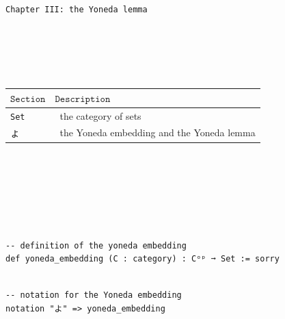 \documentclass{book}
\newcounter{lcounter}
\newcounter{sectioncount}
\newcounter{subsectioncount}
\renewcommand{\section}[1]{\newpage
\ \\
\ \\
 \begin{center} \scalebox{1.5}{\texttt{\thesectioncount . #1}} \setcounter{sectioncount}{\thesectioncount+1} \setcounter{subsectioncount}{1} \end{center}
 \begin{center}

\ \\
\ \\

\thispagestyle{empty}
\end{center}
}
\begin{document}
\newpage
{
\Huge 
\begin{center}
\ \\
\ \\
\thispagestyle{empty}
\texttt{Chapter III: the Yoneda lemma}
\end{center}
}

\ \\
\ \\
\ \\
\ \\

{
\small
\begin{center}
\begin{tabular}{|l | l |} 
 \hline
 $\texttt{Section}$ & $\texttt{Description}$ \\
 \hline
 \hline
 \texttt{Set} &\ the category of sets \\
 \hline
 ょ &\ the Yoneda embedding and the Yoneda lemma \\
 \hline 
\end{tabular}
\end{center}
}


\section{よ}

\begin{center}
\begin{tcolorbox}[width=5in,colback={white},title={\begin{center}\texttt{Lean \thelcounter} \addtocounter{lcounter}{1}  \end{center}},colbacktitle=Blue,coltitle=black]
\begin{verbatim}

-- definition of the yoneda embedding
def yoneda_embedding (C : category) : Cᵒᵖ ➞ Set := sorry

\end{verbatim}%
\end{tcolorbox}
\end{center}

\begin{center}
\begin{tcolorbox}[width=5in,colback={white},title={\begin{center}\texttt{Lean \thelcounter} \addtocounter{lcounter}{1}  \end{center}},colbacktitle=Blue,coltitle=black]
\begin{verbatim}

-- notation for the Yoneda embedding
notation "よ" => yoneda_embedding

\end{verbatim}%
\end{tcolorbox}
\end{center}
\end{document}
